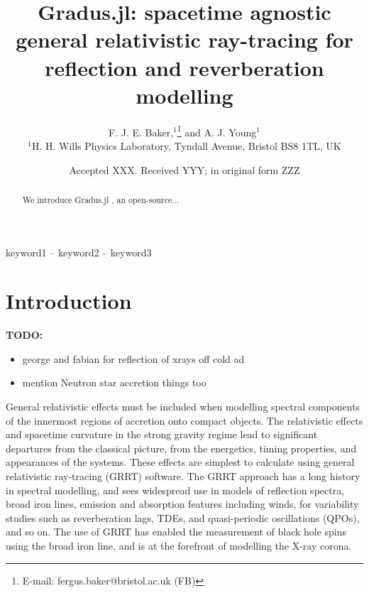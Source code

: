 \documentclass[fleqn,usenatbib]{mnras}
\title[Gradus.jl]{Gradus.jl: spacetime agnostic general relativistic ray-tracing
for reflection and reverberation modelling}
\author[F. J. E. Baker et al.]{
F. J. E. Baker,$^{1}$\thanks{E-mail: fergus.baker@bristol.ac.uk (FB)}
and A. J. Young$^{1}$
\\
$^{1}$H. H. Wills Physics Laboratory, Tyndall Avenue, Bristol BS8 1TL, UK
}
\date{Accepted XXX. Received YYY; in original form ZZZ}
\newcommand{\todo}[1]{{\noindent \bf \color{red} TODO: #1}}
\newcommand{\Gradus}{Gradus.jl }
\begin{document}
\label{firstpage}
\pagerange{\pageref{firstpage}--\pageref{lastpage}}
\maketitle
\begin{abstract}
	We introduce \Gradus, an open-source...
\end{abstract}

\begin{keywords}
keyword1 -- keyword2 -- keyword3
\end{keywords}



\section{Introduction}

\todo{
\begin{itemize}
    \item george and fabian for reflection of xrays off cold ad
    \item mention Neutron star accretion things too
\end{itemize}
}

General relativistic effects must be included when modelling spectral components
of the innermost regions of accretion onto compact objects. The relativistic
effects and spacetime curvature in the strong gravity regime lead to significant
departures from the classical picture, from the energetics, timing properties,
and appearances of the systems. These effects are simplest to calculate using
general relativistic ray-tracing (GRRT) software. The GRRT approach has a long
history in spectral modelling, and sees widespread use in models of reflection
spectra, broad iron lines, emission and absorption features including winds, for
variability studies such as reverberation lags, TDEs, and quasi-periodic
oscillations (QPOs), and so on. The use of GRRT has enabled the
measurement of black hole spins using the broad iron line, and is at the
forefront of modelling the X-ray corona.
\end{document}

